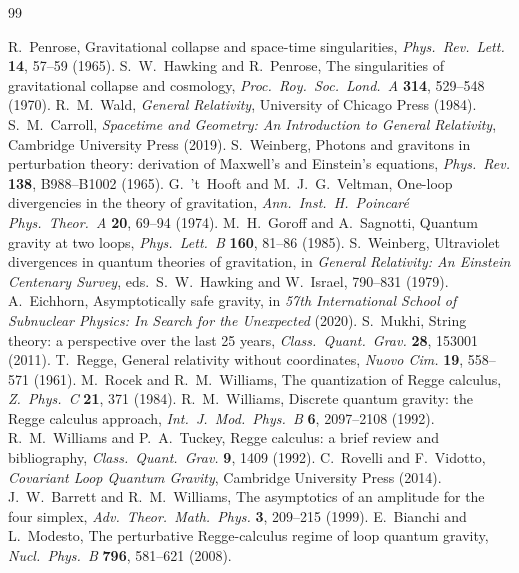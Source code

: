 \documentclass[11pt,letterpaper]{article}
\begin{document}
\begin{thebibliography}{99}

 R.~Penrose, Gravitational collapse and space-time singularities, \emph{Phys.\ Rev.\ Lett.} \textbf{14}, 57--59 (1965).
 S.~W.~Hawking and R.~Penrose, The singularities of gravitational collapse and cosmology, \emph{Proc.\ Roy.\ Soc.\ Lond.\ A} \textbf{314}, 529--548 (1970).
 R.~M.~Wald, \emph{General Relativity}, University of Chicago Press (1984).
 S.~M.~Carroll, \emph{Spacetime and Geometry: An Introduction to General Relativity}, Cambridge University Press (2019).
 S.~Weinberg, Photons and gravitons in perturbation theory: derivation of Maxwell's and Einstein's equations, \emph{Phys.\ Rev.} \textbf{138}, B988--B1002 (1965).
 G.~'t~Hooft and M.~J.~G.~Veltman, One-loop divergencies in the theory of gravitation, \emph{Ann.\ Inst.\ H.\ Poincar\'e Phys.\ Theor.\ A} \textbf{20}, 69--94 (1974).
 M.~H.~Goroff and A.~Sagnotti, Quantum gravity at two loops, \emph{Phys.\ Lett.\ B} \textbf{160}, 81--86 (1985).
 S.~Weinberg, Ultraviolet divergences in quantum theories of gravitation, in \emph{General Relativity: An Einstein Centenary Survey}, eds.\ S.~W.~Hawking and W.~Israel, 790--831 (1979).
 A.~Eichhorn, Asymptotically safe gravity, in \emph{57th International School of Subnuclear Physics: In Search for the Unexpected} (2020).
 S.~Mukhi, String theory: a perspective over the last 25 years, \emph{Class.\ Quant.\ Grav.} \textbf{28}, 153001 (2011).
 T.~Regge, General relativity without coordinates, \emph{Nuovo Cim.} \textbf{19}, 558--571 (1961).
 M.~Rocek and R.~M.~Williams, The quantization of Regge calculus, \emph{Z.\ Phys.\ C} \textbf{21}, 371 (1984).
 R.~M.~Williams, Discrete quantum gravity: the Regge calculus approach, \emph{Int.\ J.\ Mod.\ Phys.\ B} \textbf{6}, 2097--2108 (1992).
 R.~M.~Williams and P.~A.~Tuckey, Regge calculus: a brief review and bibliography, \emph{Class.\ Quant.\ Grav.} \textbf{9}, 1409 (1992).
 C.~Rovelli and F.~Vidotto, \emph{Covariant Loop Quantum Gravity}, Cambridge University Press (2014).
 J.~W.~Barrett and R.~M.~Williams, The asymptotics of an amplitude for the four simplex, \emph{Adv.\ Theor.\ Math.\ Phys.} \textbf{3}, 209--215 (1999).
 E.~Bianchi and L.~Modesto, The perturbative Regge-calculus regime of loop quantum gravity, \emph{Nucl.\ Phys.\ B} \textbf{796}, 581--621 (2008).

\end{thebibliography}
\end{document}
